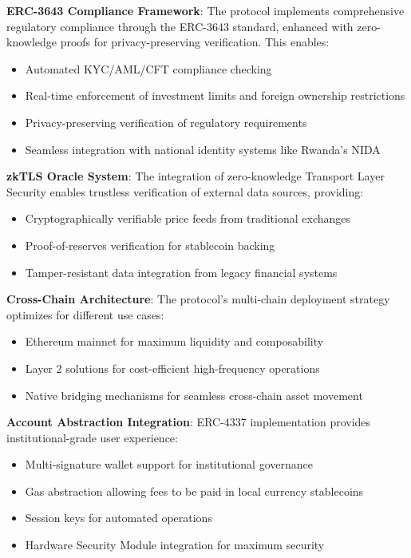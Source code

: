 \documentclass[12pt]{article}
\begin{document}
\textbf{ERC-3643 Compliance Framework}: The protocol implements comprehensive regulatory compliance through the ERC-3643 standard, enhanced with zero-knowledge proofs for privacy-preserving verification. This enables:
\begin{itemize}
	\item Automated KYC/AML/CFT compliance checking
	\item Real-time enforcement of investment limits and foreign ownership restrictions
	\item Privacy-preserving verification of regulatory requirements
	\item Seamless integration with national identity systems like Rwanda's NIDA

\end{itemize}
\textbf{zkTLS Oracle System}: The integration of zero-knowledge Transport Layer Security enables trustless verification of external data sources, providing:
\begin{itemize}
	\item Cryptographically verifiable price feeds from traditional exchanges
	\item Proof-of-reserves verification for stablecoin backing
	\item Tamper-resistant data integration from legacy financial systems

\end{itemize}
\textbf{Cross-Chain Architecture}: The protocol's multi-chain deployment strategy optimizes for different use cases:
\begin{itemize}
	\item Ethereum mainnet for maximum liquidity and composability
	\item Layer 2 solutions for cost-efficient high-frequency operations
	\item Native bridging mechanisms for seamless cross-chain asset movement

\end{itemize}
\textbf{Account Abstraction Integration}: ERC-4337 implementation provides institutional-grade user experience:
\begin{itemize}
	\item Multi-signature wallet support for institutional governance
	\item Gas abstraction allowing fees to be paid in local currency stablecoins
	\item Session keys for automated operations
	\item Hardware Security Module integration for maximum security

\end{itemize}
\end{document}
